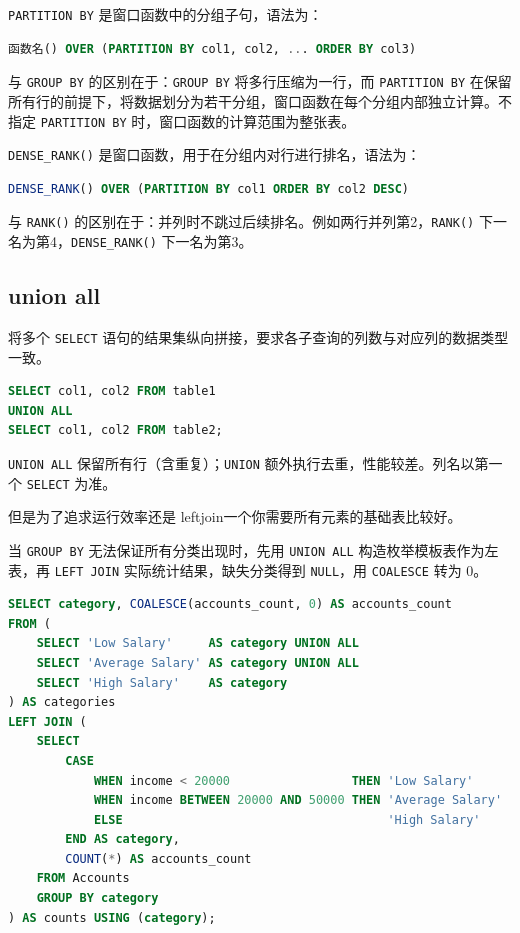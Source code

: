 \begin{definition}[PARTITION BY]
\texttt{PARTITION BY} 是窗口函数中的分组子句，语法为：
\begin{lstlisting}[language=SQL]
函数名() OVER (PARTITION BY col1, col2, ... ORDER BY col3)
\end{lstlisting}
与 \texttt{GROUP BY} 的区别在于：\texttt{GROUP BY} 将多行压缩为一行，而 \texttt{PARTITION BY} 在保留所有行的前提下，将数据划分为若干分组，窗口函数在每个分组内部独立计算。不指定 \texttt{PARTITION BY} 时，窗口函数的计算范围为整张表。
\end{definition}
\begin{definition}
\texttt{DENSE\_RANK()} 是窗口函数，用于在分组内对行进行排名，语法为：
\begin{lstlisting}[language=SQL]
DENSE_RANK() OVER (PARTITION BY col1 ORDER BY col2 DESC)
\end{lstlisting}
与 \texttt{RANK()} 的区别在于：并列时不跳过后续排名。例如两行并列第2，\texttt{RANK()} 下一名为第4，\texttt{DENSE\_RANK()} 下一名为第3。
\end{definition}

\subsection{union all}
\begin{definition}
将多个 \texttt{SELECT} 语句的结果集纵向拼接，要求各子查询的列数与对应列的数据类型一致。
\begin{lstlisting}[language=SQL]
SELECT col1, col2 FROM table1
UNION ALL
SELECT col1, col2 FROM table2;
\end{lstlisting}
\texttt{UNION ALL} 保留所有行（含重复）；\texttt{UNION} 额外执行去重，性能较差。列名以第一个 \texttt{SELECT} 为准。
\end{definition}
但是为了追求运行效率还是
leftjoin一个你需要所有元素的基础表比较好。

\begin{homework}[1907 | 高级查询和连接 第7题]
\begin{definition}
当 \texttt{GROUP BY} 无法保证所有分类出现时，先用 \texttt{UNION ALL} 构造枚举模板表作为左表，再 \texttt{LEFT JOIN} 实际统计结果，缺失分类得到 \texttt{NULL}，用 \texttt{COALESCE} 转为 0。
\begin{lstlisting}[language=SQL]
SELECT category, COALESCE(accounts_count, 0) AS accounts_count
FROM (
    SELECT 'Low Salary'     AS category UNION ALL
    SELECT 'Average Salary' AS category UNION ALL
    SELECT 'High Salary'    AS category
) AS categories
LEFT JOIN (
    SELECT
        CASE
            WHEN income < 20000                 THEN 'Low Salary'
            WHEN income BETWEEN 20000 AND 50000 THEN 'Average Salary'
            ELSE                                     'High Salary'
        END AS category,
        COUNT(*) AS accounts_count
    FROM Accounts
    GROUP BY category
) AS counts USING (category);
\end{lstlisting}
\end{definition}
\end{homework}

